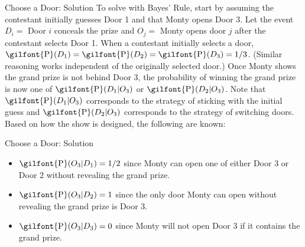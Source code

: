 \documentclass[
  ignorenonframetext,
]{beamer}
\begin{document}
\begin{frame}{Choose a Door: Solution}
\label{choose-a-door-solution}
To solve with Bayes' Rule, start by assuming the contestant initially
guesses Door 1 and that Monty opens Door 3. Let the event \(D_i=\) Door
\(i\) conceals the prize and \(O_j=\) Monty opens door \(j\) after the
contestant selects Door 1. When a contestant initially selects a door,
\(\textrm{\gilfont{P}}\normalfont (D_1)=\textrm{\gilfont{P}}\normalfont (D_2)=\textrm{\gilfont{P}}\normalfont (D_3)=1/3\).
(Similar reasoning works independent of the originally selected door.)
Once Monty shows the grand prize is not behind Door 3, the probability
of winning the grand prize is now one of
\(\textrm{\gilfont{P}}\normalfont (D_1|O_3)\) or
\(\textrm{\gilfont{P}}\normalfont (D_2|O_3)\). Note that
\(\textrm{\gilfont{P}}\normalfont (D_1|O_3)\) corresponds to the
strategy of sticking with the initial guess and
\(\textrm{\gilfont{P}}\normalfont (D_2|O_3)\) corresponds to the
strategy of switching doors. Based on how the show is designed, the
following are known:
\end{frame}

\begin{frame}{Choose a Door: Solution}
\label{choose-a-door-solution-1}
\begin{itemize}
\item $\textrm{\gilfont{P}}\normalfont (O_3|D_1)=1/2$ since Monty can open one of either Door 3 or Door 2 without revealing the grand prize.
\item $\textrm{\gilfont{P}}\normalfont (O_3|D_2)=1$ since the only door Monty can open without revealing the grand prize is Door 3.
\item $\textrm{\gilfont{P}}\normalfont (O_3|D_3)=0$ since Monty will not open Door 3 if it contains the grand prize.
\end{itemize}
\end{frame}
\end{document}
